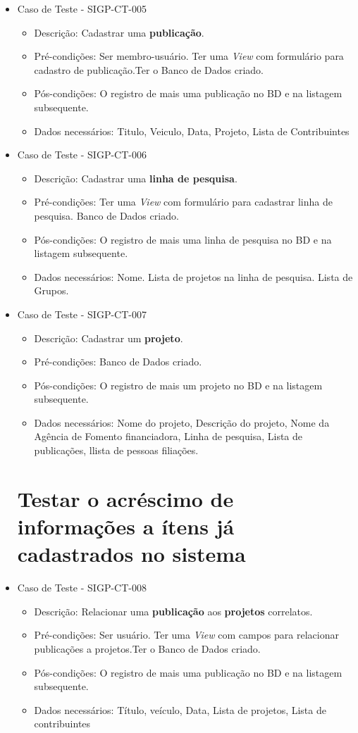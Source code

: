 \documentclass[11pt, a4paper]{book}
\begin{document}
\begin{itemize}
	\item Caso de Teste - SIGP-CT-005
	\begin{itemize}
	\item Descrição: Cadastrar uma \textbf{publicação}.
	\item Pré-condições: Ser membro-usuário. Ter uma \emph{View} com formulário para cadastro de publicação.Ter o Banco de Dados criado.
	\item Pós-condições: O registro de mais uma publicação no BD e na listagem subsequente.
	\item Dados necessários: Titulo, Veiculo, Data, Projeto, Lista de Contribuintes
	\end{itemize}


	\item Caso de Teste - SIGP-CT-006
	\begin{itemize}
	\item Descrição: Cadastrar uma \textbf{linha de pesquisa}.
	\item Pré-condições: Ter uma \emph{View} com formulário para cadastrar linha de pesquisa. Banco de Dados criado.
	\item Pós-condições: O registro de mais uma linha de pesquisa no BD e na listagem subsequente.
	\item Dados necessários: Nome. Lista de projetos na linha de pesquisa. Lista de Grupos.
	\end{itemize}

	\item Caso de Teste - SIGP-CT-007
	\begin{itemize}
	\item Descrição: Cadastrar um \textbf{projeto}.
	\item Pré-condições: Banco de Dados criado.
	\item Pós-condições: O registro de mais um projeto no BD e na listagem subsequente.
	\item Dados necessários: Nome do projeto, Descrição do projeto, Nome da Agência de Fomento financiadora, Linha de pesquisa, Lista de publicações, llista de pessoas filiações.
	\end{itemize}

\newpage
\section{Testar o acréscimo de informações a ítens já cadastrados no sistema}

	\item Caso de Teste - SIGP-CT-008
	\begin{itemize}
	\item Descrição: Relacionar uma \textbf{publicação} aos \textbf{projetos} correlatos.
	\item Pré-condições: Ser usuário. Ter uma \emph{View} com campos para relacionar publicações a projetos.Ter o Banco de Dados criado.
	\item Pós-condições: O registro de mais uma publicação no BD e na listagem subsequente.
	\item Dados necessários: Título, veículo, Data, Lista de projetos, Lista de contribuintes
	\end{itemize}


\end{itemize}
\end{document}
